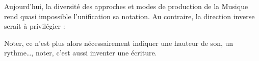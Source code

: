 Aujourd'hui, la diversité des approches et modes de production de la Musique rend quasi impossible l'unification sa notation.
Au contraire, la direction inverse serait à privilégier :
\begin{displayquote}
\og Noter, ce n'est plus alors nécessairement indiquer une hauteur de son, un rythme…, noter, c'est aussi inventer une écriture.\fg 
\end{displayquote} 

